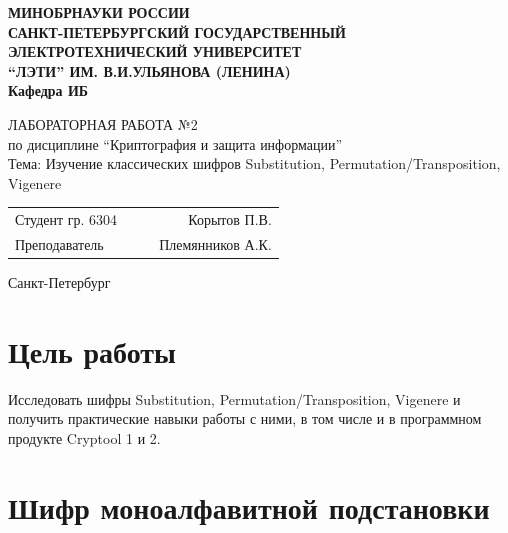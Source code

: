 \documentclass[a4paper, 14pt]{extarticle}
\begin{document}
\begin{titlepage}
    \centering
    {\bfseries
        \uppercase{
            Минобрнауки России \\
            Санкт-Петербургский государственный \\
            Электротехнический университет \\
            \enquote{ЛЭТИ} им. В.И.Ульянова (Ленина)\\
        }
        Кафедра ИБ

        \vspace{\fill}
        \uppercase{Лабораторная работа №2} \\
        по дисциплине \enquote{Криптография и защита информации} \\
        Тема: Изучение классических шифров Substitution, Permutation/Transposition, Vigenere
    }

    \vspace{\fill}
    \begin{tabularx}{0.8\textwidth}{l X c r}
        Студент гр. 6304 & & \underline{\hspace{3cm}} & Корытов П.В.\\
        Преподаватель & & \underline{\hspace{3cm}} & Племянников А.К.
    \end{tabularx}

    \vspace{1cm}
    Санкт-Петербург \\
    \the\year{}
\end{titlepage}

\newpage

\section*{Цель работы}
Исследовать шифры Substitution, Permutation/Transposition, Vigenere и получить практические навыки работы с ними, в том числе и в программном продукте Cryptool 1 и 2.

\section{Шифр моноалфавитной подстановки}
\end{document}
